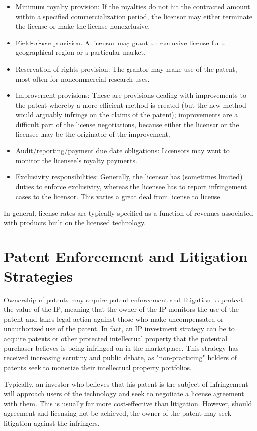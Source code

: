 \documentclass[11pt]{article}
\begin{document}
\begin{itemize}
  \item Minimum royalty provision: If the royalties do not hit the contracted amount within a specified commercialization period, the licensor may either terminate the license or make the license nonexclusive.
  \item Field-of-use provision: A licensor may grant an exclusive license for a geographical region or a particular market.
  \item Reservation of rights provision: The grantor may make use of the patent, most often for noncommercial research uses.
  \item Improvement provisions: These are provisions dealing with improvements to the patent whereby a more efficient method is created (but the new method would arguably infringe on the claims of the patent); improvements are a difficult part of the license negotiations, because either the licensor or the licensee may be the originator of the improvement.
  \item Audit/reporting/payment due date obligations: Licensors may want to monitor the licensee's royalty payments.
  \item Exclusivity responsibilities: Generally, the licensor has (sometimes limited) duties to enforce exclusivity, whereas the licensee has to report infringement cases to the licensor. This varies a great deal from license to license.
\end{itemize}

In general, license rates are typically specified as a function of revenues associated with products built on the licensed technology.

\section*{Patent Enforcement and Litigation Strategies}
Ownership of patents may require patent enforcement and litigation to protect the value of the IP, meaning that the owner of the IP monitors the use of the patent and takes legal action against those who make uncompensated or unauthorized use of the patent. In fact, an IP investment strategy can be to acquire patents or other protected intellectual property that the potential purchaser believes is being infringed on in the marketplace. This strategy has received increasing scrutiny and public debate, as "non-practicing" holders of patents seek to monetize their intellectual property portfolios.

Typically, an investor who believes that his patent is the subject of infringement will approach users of the technology and seek to negotiate a license agreement with them. This is usually far more cost-effective than litigation. However, should agreement and licensing not be achieved, the owner of the patent may seek litigation against the infringers.
\end{document}
